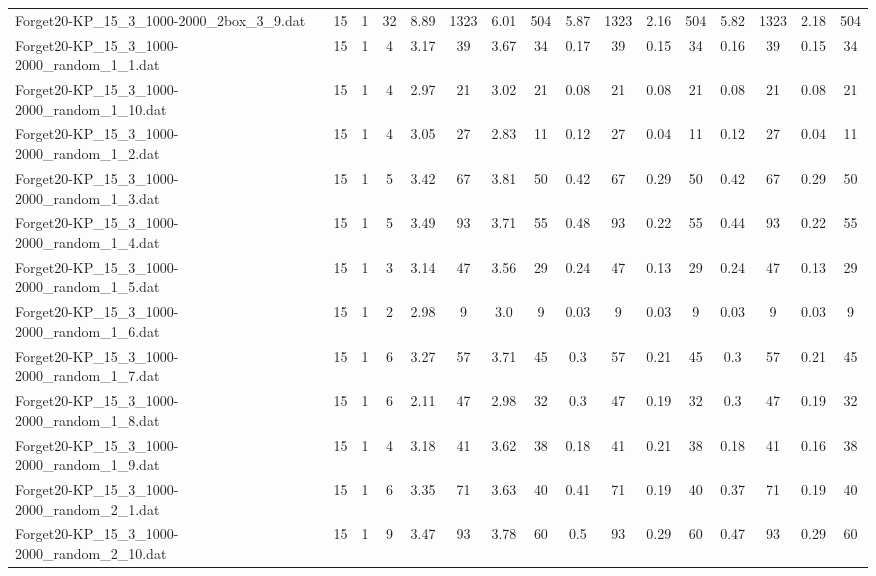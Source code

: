 \begin{sidewaystable}[!ht]
{\begin{tabular}{lccccccccccccccc}
Forget20-KP\_15\_3\_1000-2000\_2box\_3\_9.dat & 15 & 1 & 32 & 8.89 & 1323 & 6.01 & 504 & 5.87 & 1323 & 2.16 & 504 & 5.82 & 1323 & 2.18 & 504 \\
Forget20-KP\_15\_3\_1000-2000\_random\_1\_1.dat & 15 & 1 & 4 & 3.17 & 39 & 3.67 & 34 & 0.17 & 39 &  \textcolor{blue2}{0.15} & 34 & 0.16 & 39 &  \textcolor{blue2}{0.15} & 34 \\
Forget20-KP\_15\_3\_1000-2000\_random\_1\_10.dat & 15 & 1 & 4 & 2.97 & 21 & 3.02 & 21 &  \textcolor{blue2}{0.08} & 21 &  \textcolor{blue2}{0.08} & 21 &  \textcolor{blue2}{0.08} & 21 &  \textcolor{blue2}{0.08} & 21 \\
Forget20-KP\_15\_3\_1000-2000\_random\_1\_2.dat & 15 & 1 & 4 & 3.05 & 27 & 2.83 & 11 & 0.12 & 27 &  \textcolor{blue2}{0.04} & 11 & 0.12 & 27 &  \textcolor{blue2}{0.04} & 11 \\
Forget20-KP\_15\_3\_1000-2000\_random\_1\_3.dat & 15 & 1 & 5 & 3.42 & 67 & 3.81 & 50 & 0.42 & 67 &  \textcolor{blue2}{0.29} & 50 & 0.42 & 67 &  \textcolor{blue2}{0.29} & 50 \\
Forget20-KP\_15\_3\_1000-2000\_random\_1\_4.dat & 15 & 1 & 5 & 3.49 & 93 & 3.71 & 55 & 0.48 & 93 &  \textcolor{blue2}{0.22} & 55 & 0.44 & 93 &  \textcolor{blue2}{0.22} & 55 \\
Forget20-KP\_15\_3\_1000-2000\_random\_1\_5.dat & 15 & 1 & 3 & 3.14 & 47 & 3.56 & 29 & 0.24 & 47 &  \textcolor{blue2}{0.13} & 29 & 0.24 & 47 &  \textcolor{blue2}{0.13} & 29 \\
Forget20-KP\_15\_3\_1000-2000\_random\_1\_6.dat & 15 & 1 & 2 & 2.98 & 9 & 3.0 & 9 &  \textcolor{blue2}{0.03} & 9 &  \textcolor{blue2}{0.03} & 9 &  \textcolor{blue2}{0.03} & 9 &  \textcolor{blue2}{0.03} & 9 \\
Forget20-KP\_15\_3\_1000-2000\_random\_1\_7.dat & 15 & 1 & 6 & 3.27 & 57 & 3.71 & 45 & 0.3 & 57 & 0.21 & 45 & 0.3 & 57 & 0.21 & 45 \\
Forget20-KP\_15\_3\_1000-2000\_random\_1\_8.dat & 15 & 1 & 6 & 2.11 & 47 & 2.98 & 32 & 0.3 & 47 &  \textcolor{blue2}{0.19} & 32 & 0.3 & 47 &  \textcolor{blue2}{0.19} & 32 \\
Forget20-KP\_15\_3\_1000-2000\_random\_1\_9.dat & 15 & 1 & 4 & 3.18 & 41 & 3.62 & 38 & 0.18 & 41 & 0.21 & 38 & 0.18 & 41 &  \textcolor{blue2}{0.16} & 38 \\
Forget20-KP\_15\_3\_1000-2000\_random\_2\_1.dat & 15 & 1 & 6 & 3.35 & 71 & 3.63 & 40 & 0.41 & 71 &  \textcolor{blue2}{0.19} & 40 & 0.37 & 71 &  \textcolor{blue2}{0.19} & 40 \\
Forget20-KP\_15\_3\_1000-2000\_random\_2\_10.dat & 15 & 1 & 9 & 3.47 & 93 & 3.78 & 60 & 0.5 & 93 &  \textcolor{blue2}{0.29} & 60 & 0.47 & 93 &  \textcolor{blue2}{0.29} & 60 \\

\end{tabular}}
\end{sidewaystable}
